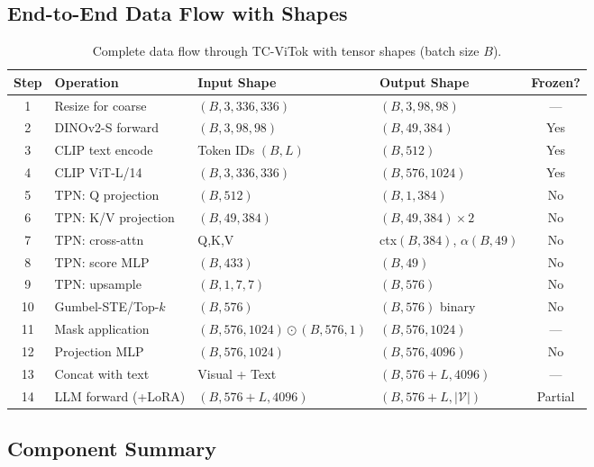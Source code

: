 \documentclass[11pt,a4paper]{article}
\begin{document}
\subsection{End-to-End Data Flow with Shapes}

\begin{table}[h]
\centering
\caption{Complete data flow through TC-ViTok with tensor shapes
(batch size $B$).}
\label{tab:data_flow}
\renewcommand{\arraystretch}{1.15}
\small
\begin{tabular}{@{}clllc@{}}
  \toprule
  Step & Operation & Input Shape & Output Shape & Frozen? \\
  \midrule
  1 & Resize for coarse & $(B,3,336,336)$ & $(B,3,98,98)$ & --- \\
  2 & DINOv2-S forward & $(B,3,98,98)$ & $(B,49,384)$ & Yes \\
  3 & CLIP text encode & Token IDs $(B,L)$ & $(B,512)$ & Yes \\
  4 & CLIP ViT-L/14 & $(B,3,336,336)$ & $(B,576,1024)$ & Yes \\
  5 & TPN: Q projection & $(B,512)$ & $(B,1,384)$ & No \\
  6 & TPN: K/V projection & $(B,49,384)$ & $(B,49,384)\times 2$ & No \\
  7 & TPN: cross-attn & Q,K,V & ctx$(B,384)$, $\alpha(B,49)$ & No \\
  8 & TPN: score MLP & $(B,433)$ & $(B,49)$ & No \\
  9 & TPN: upsample & $(B,1,7,7)$ & $(B,576)$ & No \\
  10 & Gumbel-STE/Top-$k$ & $(B,576)$ & $(B,576)$ binary & No \\
  11 & Mask application & $(B,576,1024)\!\odot\!(B,576,1)$ & $(B,576,1024)$ & --- \\
  12 & Projection MLP & $(B,576,1024)$ & $(B,576,4096)$ & No \\
  13 & Concat with text & Visual + Text & $(B,576{+}L,4096)$ & --- \\
  14 & LLM forward (+LoRA) & $(B,576{+}L,4096)$ & $(B,576{+}L,|\mathcal{V}|)$ & Partial \\
  \bottomrule
\end{tabular}
\end{table}

\subsection{Component Summary}
\end{document}
